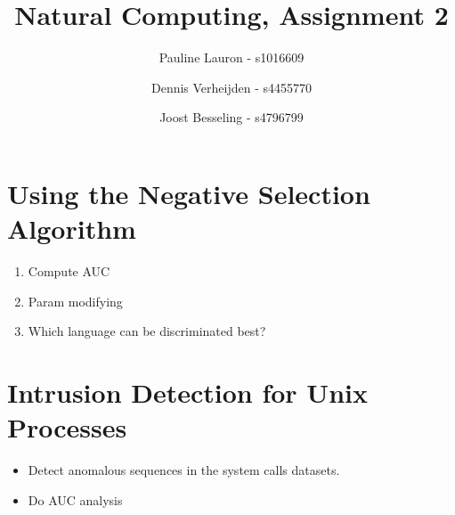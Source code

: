 \documentclass[11pt]{article}
\title{Natural Computing, Assignment 2}
\author{Pauline Lauron - s1016609 \and Dennis Verheijden - s4455770 \and Joost Besseling - s4796799}
\begin{document}
\maketitle

\section{Using the Negative Selection Algorithm}
\begin{enumerate}[1.]
\item Compute AUC
\item Param modifying
\item Which language can be discriminated best?
\end{enumerate}

\section{Intrusion Detection for Unix Processes}
\begin{itemize}
\item Detect anomalous sequences in the system calls datasets.
\item Do AUC analysis
\end{itemize}
\end{document}
